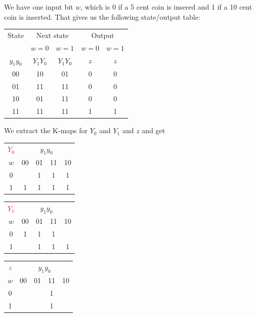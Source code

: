 \documentclass[10pt,a4paper]{scrartcl}
\begin{document}
We have one input bit $w$, which is 0 if a 5 cent coin is insered and 1 if a 10 cent coin is inserted. That gives us the following state/output table:


\begin{tabular}{|c||c|c||c|c|}
  \hline
 State   & \multicolumn{2}{c||}{Next state} & \multicolumn{2}{c|}{Output} \\
         & $w=0$        & $w=1$            & $w=0$       & $w=1$ \\
$y_1y_0$ & $Y_1Y_0$     & $Y_1Y_0$         & $z$         & $z$   \\ \hline\hline
00       & 10           & 01               & 0           & 0     \\ \hline  
01       & 11           & 11               & 0           & 0     \\ \hline
10       & 01           & 11               & 0           & 0     \\ \hline
11       & 11           & 11               & 1           & 1     \\ \hline
\end{tabular}

We extract the K-maps for $Y_0$ and $Y_1$ and $z$ and get

\begin{tabular}{|c||c|c|c|c|}
  \hline
\textcolor{red}{$Y_0$}    & \multicolumn{4}{c|}{$y_1y_0$} \\
$w$    & 00 & 01  & 11  & 10\\ \hline\hline
  0    &    & 1   & 1   & 1 \\ \hline
  1    & 1  & 1   & 1   & 1 \\ 
  \hline
\end{tabular}
\hspace{1cm}
\begin{tabular}{|c||c|c|c|c|}
  \hline
\textcolor{red}{$Y_1$}     & \multicolumn{4}{c|}{$y_1y_0$} \\
$w$    & 00 & 01  & 11  & 10\\ \hline\hline
  0    & 1  & 1   & 1   &   \\ \hline
  1    &    & 1   & 1   & 1 \\ 
  \hline
\end{tabular}
\hspace{1cm}
\begin{tabular}{|c||c|c|c|c|}
  \hline
\textcolor{red}{$z$}   & \multicolumn{4}{c|}{$y_1y_0$} \\
$w$    & 00 & 01  & 11  & 10\\ \hline\hline
  0    &    &     & 1   &   \\ \hline
  1    &    &     & 1   &   \\ 
  \hline
\end{tabular}
\end{document}
